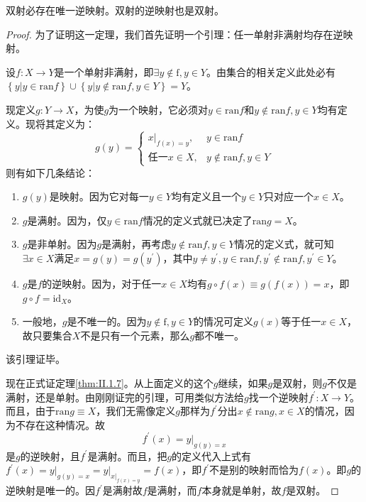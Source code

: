 \documentclass[main.tex]{subfiles}
\begin{document}
\begin{theorem}\label{thm:II.1.7}
双射必存在唯一逆映射。双射的逆映射也是双射。
\end{theorem}
\begin{proof}
为了证明这一定理，我们首先证明一个引理：任一单射非满射均存在逆映射。

设$f:X\rightarrow Y$是一个单射非满射，即$\exists y\notin\mathrm{f},y\in Y$。由集合的相关定义此处必有$\left\{y|y\in\mathrm{ran}f\right\}\cup\left\{y|y\notin\mathrm{ran}f,y\in Y\right\}=Y$。


现定义$g:Y\rightarrow X$，为使$g$为一个映射，它必须对$y\in\mathrm{ran}f$和$y\notin\mathrm{ran}f,y\in Y$均有定义。现将其定义为：
\[
g\left(y\right)=\left\{
\begin{array}{ll}
\left.x\right|_{f\left(x\right)=y},&y\in\mathrm{ran}f\\
\text{任一}x\in X,&y\notin\mathrm{ran}f,y\in Y
\end{array}
\right.
\]
则有如下几条结论：
\begin{enumerate}
    \item $g\left(y\right)$是映射。因为它对每一$y\in Y$均有定义且一个$y\in Y$只对应一个$x\in X$。
    \item $g$是满射。因为，仅$y\in\mathrm{ran}f$情况的定义式就已决定了$\mathrm{ran}g=X$。
    \item $g$是非单射。因为$g$是满射，再考虑$y\notin\mathrm{ran}f,y\in Y$情况的定义式，就可知$\exists x\in X$满足$x=g\left(y\right)=g\left(y^\prime\right)$，其中$y\neq y^\prime,y\in\mathrm{ran}f,y^\prime\notin\mathrm{ran}f,y^\prime\in Y$。
    \item $g$是$f$的逆映射。因为，对于任一$x\in X$均有$g\circ f\left(x\right)\equiv g\left(f\left(x\right)\right)=x$，即$g\circ f=\mathrm{id}_X$。
    \item 一般地，$g$是不唯一的。因为$y\notin\mathrm{f},y\in Y$的情况可定义$g\left(x\right)$等于任一$x\in X$，故只要集合$X$不是只有一个元素，那么$g$都不唯一。
\end{enumerate}
该引理证毕。

现在正式证定理\ref{thm:II.1.7}。从上面定义的这个$g$继续，如果$g$是双射，则$g$不仅是满射，还是单射。由刚刚证完的引理，可用类似方法给$g$找一个逆映射$f^\prime:X\rightarrow Y$。而且，由于$\mathrm{ran}g\equiv X$，我们无需像定义$g$那样为$f^\prime$分出$x\notin\mathrm{ran}g,x\in X$的情况，因为不存在这种情况。故
\[
f^\prime\left(x\right)=\left.y\right|_{g\left(y\right)=x}
\]
是$g$的逆映射，且$f^\prime$是满射。而且，把$g$的定义代入上式有$f^\prime\left(x\right)=\left.y\right|_{g\left(y\right)=x}=\left.y\right|_{\left.x\right|_{f\left(x\right)=y}}=f\left(x\right)$，即$f^\prime$不是别的映射而恰为$f\left(x\right)$。即$g$的逆映射是唯一的。因$f^\prime$是满射故$f$是满射，而$f$本身就是单射，故$f$是双射。
\end{proof}
\end{document}
